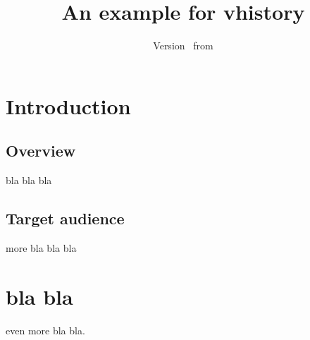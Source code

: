 \documentclass{scrartcl}
\begin{document}
{\renewcommand{\setseparator}{ \and }
\title{An example for vhistory}
\author{\vhListAllAuthorsLongWithAbbrev}
\date{Version \vhCurrentVersion\ from \vhCurrentDate}
\maketitle
}

\begin{versionhistory}
\end{versionhistory}

\tableofcontents
\clearpage

\section{Introduction}
\subsection{Overview}
bla bla bla

\subsection{Target audience}
more bla bla bla

\section{bla bla}
even more bla bla.
\end{document}
